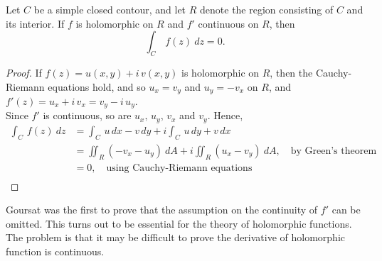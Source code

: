 \begin{theorem}
Let $C$ be a simple closed contour, and let $R$ denote the region consisting of $C$ and its interior. If $f$ is holomorphic on $R$ and $f'$ continuous on $R$, then
\[\int_C\,f(z)\ dz = 0.\]
\end{theorem}
\begin{proof}
If $f(z) = u(x,y) + i\,v(x,y)$ is holomorphic on $R$, then the Cauchy-Riemann equations hold, and so $u_x = v_y$ and $u_y = -v_x$ on $R$, and $f'(z) = u_x + i\,v_x = v_y - i\,u_y$.\\[0.5em]
Since $f'$ is continuous, so are $u_x,\,u_y,\,v_x$ and $v_y$. Hence, 
\begin{align*}
\int_C\,f(z)\ dz &= \int_C\, u\,dx - v\,dy + i\int_C\,u\,dy + v\,dx\\[1em]
 &= \iint_R (-v_x-u_y)\ dA + i\iint_R (u_x - v_y)\ dA,\quad \text{by Green's theorem}\\[1em]
 &= 0,\quad \text{using Cauchy-Riemann equations}\\[-3em]
\end{align*}
\end{proof}


Goursat was the first to prove that the assumption on the continuity of $f'$ can be omitted. This turns out to be essential for the theory of holomorphic functions. The problem is that it may be difficult to prove the derivative of holomorphic function is continuous. 

